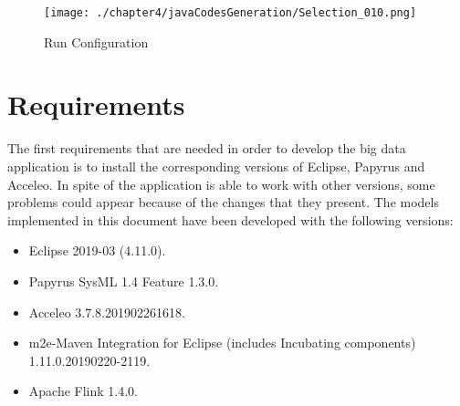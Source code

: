 \begin{figure}
\centering
{\texttt{[image: ./chapter4/javaCodesGeneration/Selection\_010.png]}}
\caption{Run Configuration}
\label{fig:Run Configuration}
\end{figure}

\section{Requirements}
The first requirements that are needed in order to develop the big data application is to install the corresponding versions of Eclipse, Papyrus and Acceleo. In spite of the application is able to work with other versions, some problems could appear because of the changes that they present. The models implemented in this document have been developed with the following versions:

\begin{itemize}
\item Eclipse 2019-03 (4.11.0).
\item Papyrus SysML 1.4 Feature	1.3.0.
\item Acceleo 3.7.8.201902261618.
\item m2e-Maven Integration for Eclipse (includes Incubating components) 1.11.0.20190220-2119.
\item Apache Flink 1.4.0.
\end{itemize}


